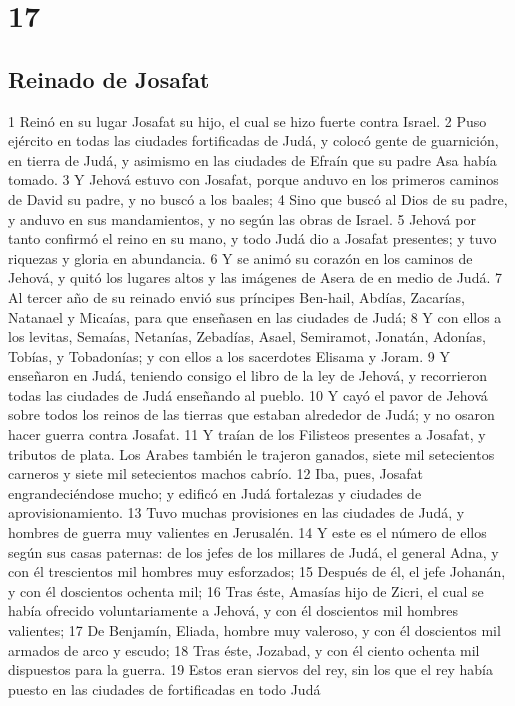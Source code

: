 \chapter{17}

\section*{Reinado de Josafat}

1 Reinó en su lugar Josafat su hijo, el cual se hizo fuerte contra Israel.
2 Puso ejército en todas las ciudades fortificadas de Judá, y colocó gente de guarnición, en tierra de Judá, y asimismo en las ciudades de Efraín que su padre Asa había tomado.
3 Y Jehová estuvo con Josafat, porque anduvo en los primeros caminos de David su padre, y no buscó a los baales;
4 Sino que buscó al Dios de su padre, y anduvo en sus mandamientos, y no según las obras de Israel.
5 Jehová por tanto confirmó el reino en su mano, y todo Judá dio a Josafat presentes; y tuvo riquezas y gloria en abundancia.
6 Y se animó su corazón en los caminos de Jehová, y quitó los lugares altos y las imágenes de Asera de en medio de Judá.
7 Al tercer año de su reinado envió sus príncipes Ben-hail, Abdías, Zacarías, Natanael y Micaías, para que enseñasen en las ciudades de Judá;
8 Y con ellos a los levitas, Semaías, Netanías, Zebadías,  Asael,  Semiramot,  Jonatán,  Adonías, Tobías, y Tobadonías; y con ellos a los sacerdotes Elisama y Joram.
9 Y enseñaron en Judá, teniendo consigo el libro de la ley de Jehová, y recorrieron todas las ciudades de Judá enseñando al pueblo.
10 Y cayó el pavor de Jehová sobre todos los reinos de las tierras que estaban alrededor de Judá; y no osaron hacer guerra contra Josafat.
11 Y traían de los Filisteos presentes a Josafat, y tributos de plata. Los Arabes también le trajeron ganados, siete mil setecientos carneros y siete mil setecientos machos cabrío.
12 Iba, pues, Josafat engrandeciéndose mucho; y edificó en Judá fortalezas y ciudades de aprovisionamiento.
13 Tuvo muchas provisiones en las ciudades de Judá, y hombres de guerra muy valientes en Jerusalén.
14 Y este es el número de ellos según sus casas paternas:  de los jefes de los millares de Judá, el general Adna, y con él trescientos mil hombres muy esforzados;
15  Después de él, el jefe Johanán, y con él doscientos ochenta mil;
16 Tras éste, Amasías hijo de Zicri, el cual se había ofrecido voluntariamente a Jehová, y con él doscientos mil hombres valientes;
17 De Benjamín, Eliada, hombre muy valeroso, y con él doscientos mil armados de arco y escudo;
18 Tras éste, Jozabad, y con él ciento ochenta mil dispuestos para la guerra.
19 Estos eran siervos del rey, sin los que el rey había puesto en las ciudades de fortificadas en todo Judá

